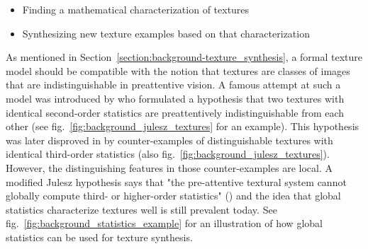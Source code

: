 \begin{itemize}
    \item Finding a mathematical characterization of textures
    \item Synthesizing new texture examples based on that characterization
\end{itemize}

As mentioned in Section~\ref{section:background-texture_synthesis}, a formal texture model should be compatible with the notion that textures are classes of images that are indistinguishable in preattentive vision. A famous attempt at such a model was introduced by \citet{Julesz1962} who formulated a hypothesis that two textures with identical second-order statistics are preattentively indistinguishable from each other (see fig.~\ref{fig:background_julesz_textures} for an example). This hypothesis was later disproved in \citet{Julesz1973} by counter-examples of distinguishable textures with identical third-order statistics (also fig.~\ref{fig:background_julesz_textures}). However, the distinguishing features in those counter-examples are local. A modified Julesz hypothesis says that "the pre-attentive textural system cannot globally compute third- or higher-order statistics" (\citet{Julesz1981}) and the idea that global statistics characterize textures well is still prevalent today. See fig.~\ref{fig:background_statistics_example} for an illustration of how global statistics can be used for texture synthesis.

